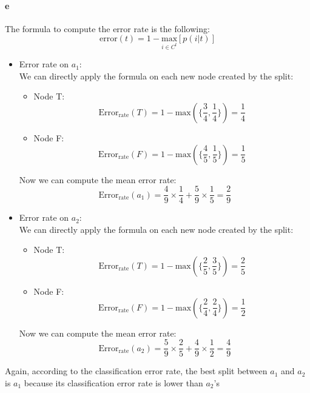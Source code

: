\documentclass[a4paper, 10pt]{article}
\begin{document}
\paragraph{e}
The formula to compute the error rate is the following:
$$
\text{error}(t) = 1 - \underset{i\in C^t}{\text{max}} [p(i\vert t)]
$$
\begin{itemize}[label=$\square$]
    \item Error rate on $a_1$:\\
    We can directly apply the formula on each new node created by the split:
    \begin{itemize}
        \item Node T:
        $$
        \text{Error}_\text{rate}(T) = 1 - \text{max}(\{\frac{3}{4}, \frac{1}{4} \}) = \frac{1}{4}
        $$
        \item Node F:
        $$
        \text{Error}_\text{rate}(F) = 1 - \text{max}(\{\frac{4}{5}, \frac{1}{5} \}) = \frac{1}{5}
        $$
    \end{itemize}
    Now we can compute the mean error rate:
    $$
    \text{Error}_\text{rate}(a_1) = \frac{4}{9}\times \frac{1}{4} + \frac{5}{9}\times\frac{1}{5} = \frac{2}{9}
    $$
    
    \item Error rate on $a_2$:\\
    We can directly apply the formula on each new node created by the split:
    \begin{itemize}
        \item Node T:
        $$
        \text{Error}_\text{rate}(T) = 1 - \text{max}(\{\frac{2}{5}, \frac{3}{5} \}) = \frac{2}{5}
        $$
        \item Node F:
        $$
        \text{Error}_\text{rate}(F) = 1 - \text{max}(\{\frac{2}{4}, \frac{2}{4} \}) = \frac{1}{2}
        $$
    \end{itemize}
    Now we can compute the mean error rate:
    $$
    \text{Error}_\text{rate}(a_2) = \frac{5}{9}\times \frac{2}{5} + \frac{4}{9}\times\frac{1}{2} = \frac{4}{9}
    $$
\end{itemize}
Again, according to the classification error rate, the best split between $a_1$ and $a_2$ is 
$a_1$ because its classification error rate is lower than $a_2$'s
\end{document}

